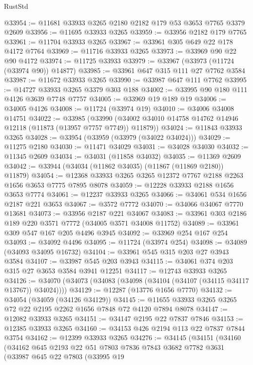 \begin{lexlean}{RustStd}
\begin{coremodule}
@33954 := @11681 @33933 @3265 @2180 @2182 @179 @53 @3653 @7765 @3379 @2609
@33956 := @11695 @33933 @3265
@33959 := @33956 @2182 @179 @7765
@33961 := @11704 @33933 @3265
@33967 := @33961 @305 @649 @22 @178 @4172 @7764
@33969 := @11716 @33933 @3265
@33973 := @33969 @90 @22 @90 @4172
@33974 := @11725 @33933
@33979 := @33967 (@33973 (@11724 (@33974 @90)) @14877)
@33985 := @33961 @647 @315 @111 @27 @7762 @3584
@33987 := @11672 @33933 @3265
@33990 := @33987 @647 @111 @7762
@33995 := @14727 @33933 @3265 @3379 @303 @188
@34002 := @33995 @90 @180 @111 @4126 @3639 @7748 @7757
@34005 := @33969 @19 @189 @19
@34006 := @34005 @4126
@34008 := @11724 (@33974 @19)
@34010 := @34006 @34008 @14751
@34022 := @33985
    (@33990 (@34002 @34010 @14758 @14762 @14946 @12118 (@11873 (@13957 @7757 @7749)) @11879))
@34024 := @11843 @33933 @3265
@34028 := @33954 (@33959 (@33979 (@34022 @34024)))
@34029 := @11275 @2180
@34030 := @11471 @34029
@34031 := @34028 @34030
@34032 := @11345 @2609
@34034 := @34031 (@11858 @34032)
@34035 := @11369 @2609
@34042 := @33944 (@34034 (@11862 @34035) (@11867 (@11869 @2180)) @11879)
@34054 := @12368 @33933 @3265 @3265 @12372 @7767 @2188 @2263 @1656 @3653 @7775 @7895 @8078
@34059 := @12228 @33933 @2188 @1656 @3653 @7774
@34061 := @12237 @33933 @3265
@34066 := @34061 @534 @1656 @2187 @221 @3653
@34067 := @3572 @7772
@34070 := @34066 @34067 @7770 @13681
@34073 := @33956 @2187 @221 @34067
@34083 := @33961 @303 @2186 @189 @220 @3571 @7772 (@34005 @3571 @34008 @11752)
@34089 := @33961 @309 @547 @167 @205 @4496 @3945
@34092 := @33969 @254 @167 @254
@34093 := @34092 @4496
@34095 := @11724 (@33974 @254)
@34098 := @34089 (@34093 @34095 @16732)
@34104 := @33961 @545 @315 @203 @27 @3943 @3584
@34107 := @33987 @545 @203 @3943
@34115 := @34061 @374 @203 @315 @27 @3653 @3584 @3941 @12251
@34117 := @12743 @33933 @3265
@34126 := @34070 (@34073 (@34083 (@34098 (@34104 (@34107 (@34115 @34117 @13767)) @34024))))
@34129 := @12287 (@13776 @1656 @7770)
@34132 := @34054 (@34059 (@34126 @34129))
@34145 := @11655 @33933 @3265 @3265 @72 @22 @2195 @2262 @1656 @7848 @72 @4120 @7894 @8078
@34147 := @12082 @33933 @3265
@34151 := @34147 @2195 @22 @7837 @7846
@34153 := @12385 @33933 @3265
@34160 := @34153 @426 @2194 @113 @22 @7837 @7844 @3754
@34162 := @12399 @33933 @3265
@34276 := @34145
    (@34151
      (@34160
        (@34162
          @645
          @2193
          @22
          @51
          @7803
          @7836
          @7843
          @3682
          @7782
          @3631
          (@33987
            @645
            @22
            @7803
            (@33995
              @19

\end{coremodule}
\end{lexlean}
